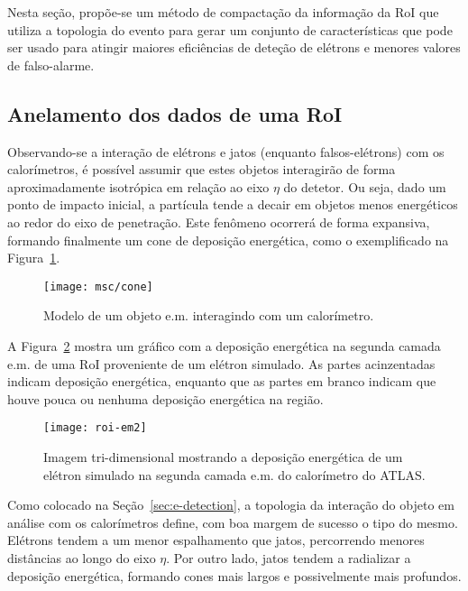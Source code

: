 Nesta seção, propõe-se um método de compactação da informação da RoI que
utiliza a topologia do evento para gerar um conjunto de características que
pode ser usado para atingir maiores eficiências de deteção de elétrons e
menores valores de falso-alarme.

\subsection{Anelamento dos dados de uma RoI}

Observando-se a interação de elétrons e jatos (enquanto falsos-elétrons) com
os calorímetros, é possível assumir que estes objetos interagirão de forma
aproximadamente isotrópica em relação ao eixo $\eta$ do detetor. Ou seja, dado
um ponto de impacto inicial, a partícula tende a decair em objetos menos
energéticos ao redor do eixo de penetração. Este fenômeno ocorrerá de forma
expansiva, formando finalmente um cone de deposição energética, como o
exemplificado na Figura~\ref{fig:cone}.

\begin{figure}
\begin{center}
\texttt{[image: msc/cone]}
\end{center}
\caption{Modelo de um objeto e.m. interagindo com um calorímetro.}
\label{fig:cone}
\end{figure}

A Figura~\ref{fig:electron-roi} mostra um gráfico com a deposição energética na
segunda camada e.m. de uma RoI proveniente de um elétron simulado. As partes
acinzentadas indicam deposição energética, enquanto que as partes em branco
indicam que houve pouca ou nenhuma deposição energética na região.

\begin{figure}
\begin{center}
\texttt{[image: roi-em2]}
\end{center}
\caption{Imagem tri-dimensional mostrando a deposição energética de
um elétron simulado na segunda camada e.m. do calorímetro do ATLAS.}
\label{fig:electron-roi}
\end{figure}

Como colocado na Seção~\ref{sec:e-detection}, a topologia da interação do
objeto em análise com os calorímetros define, com boa margem de sucesso o tipo
do mesmo. Elétrons tendem a um menor espalhamento que jatos, percorrendo
menores distâncias ao longo do eixo $\eta$. Por outro lado, jatos tendem a
radializar a deposição energética, formando cones mais largos e possivelmente
mais profundos. 

